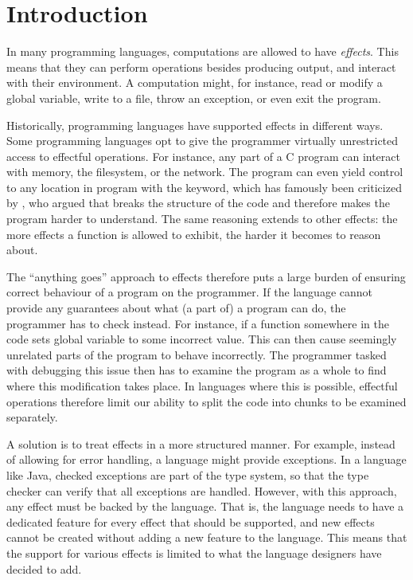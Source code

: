 \chapter{Introduction}\label{chap:introduction}

In many programming languages, computations are allowed to have \emph{effects}. This means that they can perform operations besides producing output, and interact with their environment. A computation might, for instance, read or modify a global variable, write to a file, throw an exception, or even exit the program.

Historically, programming languages have supported effects in different ways. Some programming languages opt to give the programmer virtually unrestricted access to effectful operations. For instance, any part of a C program can interact with memory, the filesystem, or the network. The program can even yield control to any location in program with the  keyword, which has famously been criticized by \textcite{dijkstra_letters_1968}, who argued that  breaks the structure of the code and therefore makes the program harder to understand. The same reasoning extends to other effects: the more effects a function is allowed to exhibit, the harder it becomes to reason about.

The ``anything goes'' approach to effects therefore puts a large burden of ensuring correct behaviour of a program on the programmer. If the language cannot provide any guarantees about what (a part of) a program can do, the programmer has to check instead. For instance, if a function somewhere in the code sets global variable to some incorrect value. This can then cause seemingly unrelated parts of the program to behave incorrectly. The programmer tasked with debugging this issue then has to examine the program as a whole to find where this modification takes place. In languages where this is possible, effectful operations therefore limit our ability to split the code into chunks to be examined separately.

A solution is to treat effects in a more structured manner. For example, instead of allowing  for error handling, a language might provide exceptions. In a language like Java, checked exceptions are part of the type system, so that the type checker can verify that all exceptions are handled. However, with this approach, any effect must be backed by the language. That is, the language needs to have a dedicated feature for every effect that should be supported, and new effects cannot be created without adding a new feature to the language. This means that the support for various effects is limited to what the language designers have decided to add.

